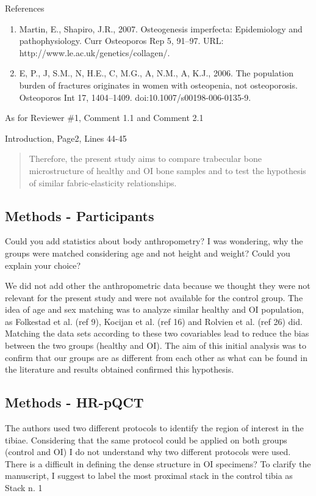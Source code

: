 \documentclass{AR2RC}
\begin{document}
References\vspace{-1em}
\begin{enumerate}
	\item Martin, E., Shapiro, J.R., 2007. Osteogenesis imperfecta: Epidemiology and pathophysiology. Curr Osteoporos Rep 5, 91–97. URL: http://www.le.ac.uk/genetics/collagen/.
	\item E, P., J, S.M., N, H.E., C, M.G., A, N.M., A, K.J., 2006. The population burden of fractures originates in women with osteopenia, not osteoporosis. Osteoporos Int 17, 1404–1409. doi:10.1007/s00198-006-0135-9.
\end{enumerate}

As for Reviewer \#1, Comment 1.1 and Comment 2.1\par

Introduction, Page2, Lines 44-45
\begin{quote}
	Therefore, the present study aims to compare trabecular bone microstructure of healthy and OI bone samples and to test the hypothesis of similar fabric-elasticity relationships.
\end{quote}

\newpage
\subsection{Methods - Participants}
\RC Could you add statistics about body anthropometry? I was wondering, why the groups were matched considering age and not height and weight? Could you explain your choice?

\AR We did not add other the anthropometric data because we thought they were not relevant for the present study and were not available for the control group. The idea of age and sex matching was to analyze similar healthy and OI population, as Folkestad et al. (ref 9), Kocijan et al. (ref 16) and Rolvien et al. (ref 26) did. Matching the data sets according to these two covariables lead to reduce the bias between the two groups (healthy and OI). The aim of this initial analysis was to confirm that our groups are as different from each other as what can be found in the literature and results obtained confirmed this hypothesis.

\subsection{Methods - HR-pQCT}
\RC The authors used two different protocols to identify the region of interest in the tibiae. Considering that the same protocol could be applied on both groups (control and OI) I do not understand why two different protocols were used. There is a difficult in defining the dense structure in OI specimens? To clarify the manuscript, I suggest to label the most proximal stack in the control tibia as Stack n. 1
\end{document}

